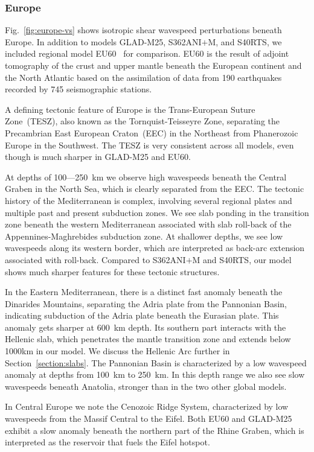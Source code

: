 \documentclass[extra,mreferee]{gji}
\begin{document}
\subsubsection{Europe}

Fig.~\ref{fig:europe-vs} shows isotropic shear wavespeed perturbations beneath Europe.
In addition to models GLAD-M25, S362ANI$+$M, and S40RTS, we included regional
model EU60~\citep{zhu2015seismic} for comparison.
EU60 is the result of adjoint tomography of the crust and upper mantle
beneath the European continent and the North Atlantic based on the assimilation of data from
190 earthquakes recorded by 745 seismographic stations.

A defining tectonic feature of Europe is the Trans-European Suture Zone~(TESZ),
also known as the Tornquist-Teisseyre Zone,
separating the  Precambrian East European Craton~(EEC) in the Northeast from
Phanerozoic Europe in the Southwest.
The TESZ is very consistent across all models,
even though is much sharper in GLAD-M25 and EU60.

At depths of 100---250~km we observe high wavespeeds beneath the Central Graben
in the North Sea, which is clearly separated from the EEC.
The tectonic history of the Mediterranean is complex,
involving several regional plates and multiple past and present subduction zones.
We see slab ponding in the transition zone beneath the western Mediterranean
associated with slab roll-back of the Appennines-Maghrebides subduction zone.
At shallower depths, we see low wavespeeds along its western border,
which are interpreted as back-arc extension associated with  roll-back.
Compared to S362ANI$+$M and S40RTS,
our model shows much sharper features for these tectonic structures.

In the Eastern Mediterranean, there is a distinct fast anomaly beneath the 
Dinarides Mountains, separating the Adria plate from the Pannonian Basin,
indicating subduction of the Adria plate beneath the Eurasian plate.
This anomaly gets sharper at 600~km depth.
Its southern part interacts with the Hellenic slab, which penetrates the mantle
transition zone and extends below 1000km in our model.
We discuss the Hellenic Arc further in Section~\ref{section:slabs}.
The Pannonian Basin is characterized by a low wavespeed
anomaly at depths from 100~km to 250~km.
In this depth range we also see slow wavespeeds beneath Anatolia,
stronger than in the two other global models.

In Central Europe we note the Cenozoic Ridge System, characterized by low 
wavespeeds from the Massif Central to the Eifel. Both EU60 and
GLAD-M25 exhibit a slow anomaly beneath the northern part of the Rhine Graben,
which is interpreted as the reservoir that fuels the Eifel hotspot.
\end{document}
